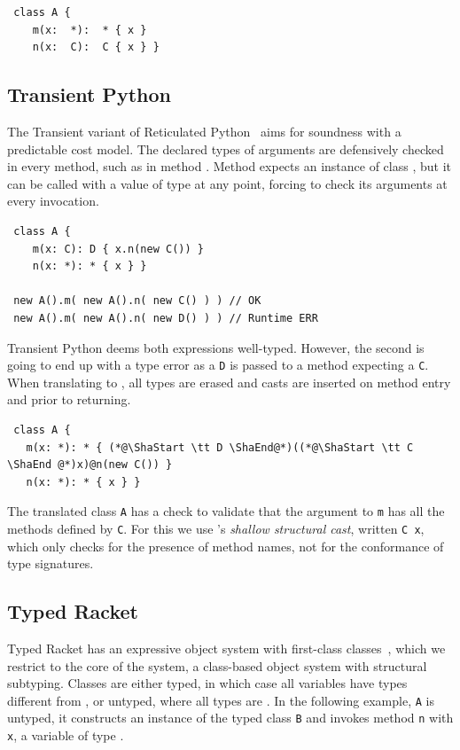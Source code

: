 \documentclass[a4paper,USenglish]{tex/lipics-v2016}
\newcommand{\code}[1]{{\tt #1}\xspace}
\begin{document}
\begin{lstlisting}
 class A {
    m(x:  *):  * { x }
    n(x:  C):  C { x } }
\end{lstlisting}

\subsection{Transient Python}

The Transient variant of Reticulated Python~\cite{siek14} aims for soundness
with a predictable cost model. The declared types of arguments are defensively
checked in every method, such as in method \m. Method \m expects an instance of
class \C, but it can be called with a value of type \any at any point, forcing
\m to check its arguments at every invocation.

\begin{lstlisting}
 class A {
    m(x: C): D { x.n(new C()) }
    n(x: *): * { x } }

 new A().m( new A().n( new C() ) ) // OK
 new A().m( new A().n( new D() ) ) // Runtime ERR
\end{lstlisting}

\noindent Transient Python deems both expressions well-typed. However, the
second is going to end up with a type error as a \code D is passed to a method
expecting a \code C.  When translating to \kafka, all types are erased and casts
are inserted on method entry and prior to returning.

\begin{lstlisting}
 class A {
   m(x: *): * { (*@\ShaStart \tt D \ShaEnd@*)((*@\ShaStart \tt C \ShaEnd @*)x)@n(new C()) }
   n(x: *): * { x } }
\end{lstlisting}

\noindent The translated class \code A has a check to validate that the
argument to \code m has all the methods defined by \code C. For this we use
\kafka's \emph{shallow structural cast}, written {\ShaStart \tt C \ShaEnd
  x}, which only checks for the presence of method names, not for the
conformance of type signatures.


\subsection{Typed Racket}

Typed Racket has an expressive object system with first-class
classes~\cite{Takikawa:2012}, which we restrict to the core of the system, a
class-based object system with structural subtyping. Classes are either typed,
in which case all variables have types different from \any, or untyped, where
all types are \any.  In the following example, \code A is untyped, it constructs
an instance of the typed class \code{B} and invokes method \code{n} with \code
x, a variable of type \any.
\end{document}
